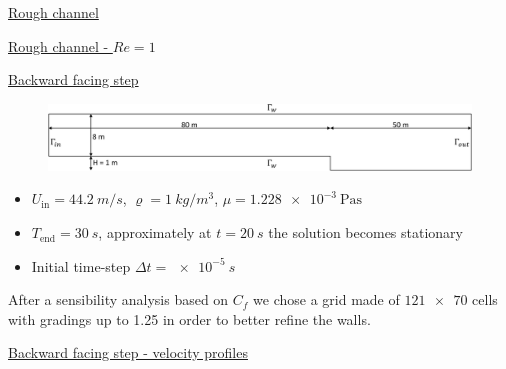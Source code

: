 \documentclass{beamer}
\begin{document}
\begin{frame}{\hyperlink{rough}{Rough channel}}
	\begin{figure}
		\centering
		
	\end{figure}
\end{frame}
\begin{frame}{\hyperlink{rough}{Rough channel - $Re=1$}}
\begin{figure}
	\centering
	
\end{figure}
\end{frame}
\begin{frame}[label=bfsSupp]{\hyperlink{bfs}{Backward facing step}}
\begin{figure}
	\centering
	\includegraphics[width=\textwidth]{bfs_domain.pdf}
\end{figure}
\begin{itemize}
	\item $U_\text{in} = \SI{44.2}{m/s}$, $\varrho=\SI{1}{kg/m^3}$, 
	$\mu=\SI{1.228e-3}{\pascal\second}$
	\item $T_\text{end}=\SI{30}{s}$, approximately at $t=\SI{20}{s}$ the 
	solution becomes stationary
	\item Initial time-step $\Delta t=\SI{e-5}{s}$
\end{itemize}
After a sensibility analysis based on $C_f$ we chose a grid made of 
$\num{121x70}$ cells with gradings up to 1.25 in order to better 
refine the walls.
\end{frame}
\begin{frame}{\hyperlink{bfs}{Backward facing step - velocity profiles}}
\vspace{-0.7cm}
\begin{figure}
	\subfloat[\tiny Profile at 
	$x/H=-4$]{\hspace{-1cm}}
	\subfloat[\tiny Profile at 
	$x/H=4$]{\hspace{-0.3cm}}
\end{figure}
\end{frame}
\end{document}
